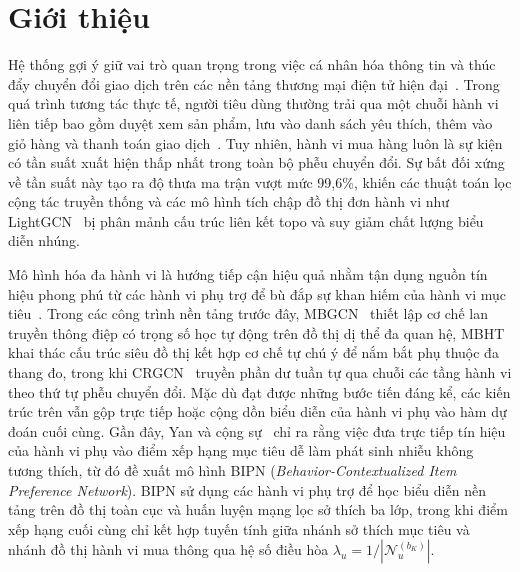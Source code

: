 \documentclass{llncs}
\begin{document}
\section{Giới thiệu}
\label{sec:intro}

Hệ thống gợi ý giữ vai trò quan trọng trong việc cá nhân hóa thông tin và thúc đẩy chuyển đổi giao dịch trên các nền tảng thương mại điện tử hiện đại~\cite{koren2009matrix,wu2022graph}. Trong quá trình tương tác thực tế, người tiêu dùng thường trải qua một chuỗi hành vi liên tiếp bao gồm duyệt xem sản phẩm, lưu vào danh sách yêu thích, thêm vào giỏ hàng và thanh toán giao dịch~\cite{gao2021neural,xia2021multiplex}. Tuy nhiên, hành vi mua hàng luôn là sự kiện có tần suất xuất hiện thấp nhất trong toàn bộ phễu chuyển đổi. Sự bất đối xứng về tần suất này tạo ra độ thưa ma trận vượt mức 99{,}6\%, khiến các thuật toán lọc cộng tác truyền thống và các mô hình tích chập đồ thị đơn hành vi như LightGCN~\cite{he2020lightgcn} bị phân mảnh cấu trúc liên kết topo và suy giảm chất lượng biểu diễn nhúng.

Mô hình hóa đa hành vi là hướng tiếp cận hiệu quả nhằm tận dụng nguồn tín hiệu phong phú từ các hành vi phụ trợ để bù đắp sự khan hiếm của hành vi mục tiêu~\cite{chen2021graph,jin2020mbgcn,wang2022multi}. Trong các công trình nền tảng trước đây, MBGCN~\cite{jin2020mbgcn} thiết lập cơ chế lan truyền thông điệp có trọng số học tự động trên đồ thị dị thể đa quan hệ, MBHT~\cite{yang2022mbht} khai thác cấu trúc siêu đồ thị kết hợp cơ chế tự chú ý để nắm bắt phụ thuộc đa thang đo, trong khi CRGCN~\cite{yan2023crgcn} truyền phần dư tuần tự qua chuỗi các tầng hành vi theo thứ tự phễu chuyển đổi. Mặc dù đạt được những bước tiến đáng kể, các kiến trúc trên vẫn gộp trực tiếp hoặc cộng dồn biểu diễn của hành vi phụ vào hàm dự đoán cuối cùng. Gần đây, Yan và cộng sự~\cite{yan2024bipn} chỉ ra rằng việc đưa trực tiếp tín hiệu của hành vi phụ vào điểm xếp hạng mục tiêu dễ làm phát sinh nhiễu không tương thích, từ đó đề xuất mô hình BIPN (\emph{Behavior-Contextualized Item Preference Network}). BIPN sử dụng các hành vi phụ trợ để học biểu diễn nền tảng trên đồ thị toàn cục và huấn luyện mạng lọc sở thích ba lớp, trong khi điểm xếp hạng cuối cùng chỉ kết hợp tuyến tính giữa nhánh sở thích mục tiêu và nhánh đồ thị hành vi mua thông qua hệ số điều hòa $\lambda_u = 1/|\mathcal{N}_u^{(b_K)}|$.
\end{document}
